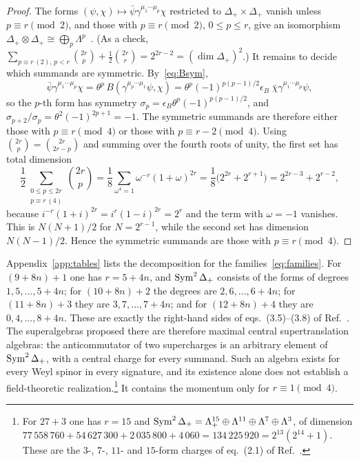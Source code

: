 \begin{proof}
The forms $(\psi,\chi)\mapsto\bar\psi\gamma^{\mu_1\cdots\mu_p}\chi$ restricted to $\Delta_+\times\Delta_+$ vanish unless $p\equiv r\pmod 2$, and those with $p\equiv r\pmod 2$, $0\le p\le r$, give an isomorphism $\Delta_+\otimes\Delta_+\cong\bigoplus_{p}\Lambda^p$~\cite{Deligne1999,VanProeyen1999}. (As a check, $\sum_{p\equiv r\,(2),\,p<r}\binom{2r}{p}+\frac12\binom{2r}{r}=2^{2r-2}=(\dim\Delta_+)^2$.) It remains to decide which summands are symmetric. By~\eqref{eq:Bsym},
\[
\bar\psi\gamma^{\mu_1\cdots\mu_p}\chi=\theta^p\,B(\gamma^{\mu_p\cdots\mu_1}\psi,\chi)=\theta^p(-1)^{p(p-1)/2}\epsilon_B\;\bar\chi\gamma^{\mu_1\cdots\mu_p}\psi ,
\]
so the $p$-th form has symmetry $\sigma_p=\epsilon_B\theta^p(-1)^{p(p-1)/2}$, and $\sigma_{p+2}/\sigma_p=\theta^2(-1)^{2p+1}=-1$. The symmetric summands are therefore either those with $p\equiv r\pmod 4$ or those with $p\equiv r-2\pmod 4$. Using $\binom{2r}{p}=\binom{2r}{2r-p}$ and summing over the fourth roots of unity, the first set has total dimension
\[
\frac12\sum_{\substack{0\le p\le 2r\\ p\equiv r\,(4)}}\binom{2r}{p}=\frac18\sum_{\omega^4=1}\omega^{-r}(1+\omega)^{2r}=\frac18\bigl(2^{2r}+2^{r+1}\bigr)=2^{2r-3}+2^{r-2},
\]
because $i^{-r}(1+i)^{2r}=i^{r}(1-i)^{2r}=2^r$ and the term with $\omega=-1$ vanishes. This is $N(N+1)/2$ for $N=2^{r-1}$, while the second set has dimension $N(N-1)/2$. Hence the symmetric summands are those with $p\equiv r\pmod 4$.
\end{proof}

Appendix~\ref{app:tables} lists the decomposition for the families~\eqref{eq:families}. For $(9+8n)+1$ one has $r=5+4n$, and $\operatorname{Sym}^2\Delta_+$ consists of the forms of degrees $1,5,\dots,5+4n$; for $(10+8n)+2$ the degrees are $2,6,\dots,6+4n$; for $(11+8n)+3$ they are $3,7,\dots,7+4n$; and for $(12+8n)+4$ they are $0,4,\dots,8+4n$. These are exactly the right-hand sides of eqs.~(3.5)--(3.8) of Ref.~\cite{RiosMarraniChester2019}. The superalgebras proposed there are therefore maximal central supertranslation algebras: the anticommutator of two supercharges is an arbitrary element of $\operatorname{Sym}^2\Delta_+$, with a central charge for every summand. Such an algebra exists for every Weyl spinor in every signature, and its existence alone does not establish a field-theoretic realization.\footnote{For $27+3$ one has $r=15$ and $\operatorname{Sym}^2\Delta_+=\Lambda^{15}_+\oplus\Lambda^{11}\oplus\Lambda^7\oplus\Lambda^3$, of dimension $77\,558\,760+54\,627\,300+2\,035\,800+4\,060=134\,225\,920=2^{13}(2^{14}+1)$. These are the $3$-, $7$-, $11$- and $15$-form charges of eq.~(2.1) of Ref.~\cite{RiosMarraniChester2020}.} It contains the momentum only for $r\equiv1\pmod4$.

